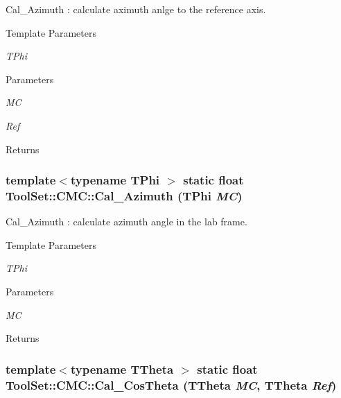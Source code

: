 Cal\_\-Azimuth : calculate aximuth anlge to the reference axis. 
\begin{DoxyTemplParams}{Template Parameters}
\item[{\em TPhi}]\end{DoxyTemplParams}

\begin{DoxyParams}{Parameters}
\item[{\em MC}]\item[{\em Ref}]\end{DoxyParams}
\begin{DoxyReturn}{Returns}

\end{DoxyReturn}
\hypertarget{classToolSet_1_1CMC_a3c8cfd47eac44d6e39a38598bb9158f1}{
\subsubsection[{Cal\_\-Azimuth}]{\setlength{\rightskip}{0pt plus 5cm}template$<$typename TPhi $>$ static float ToolSet::CMC::Cal\_\-Azimuth (TPhi {\em MC})}}
\label{classToolSet_1_1CMC_a3c8cfd47eac44d6e39a38598bb9158f1}


Cal\_\-Azimuth : calculate azimuth angle in the lab frame. 
\begin{DoxyTemplParams}{Template Parameters}
\item[{\em TPhi}]\end{DoxyTemplParams}

\begin{DoxyParams}{Parameters}
\item[{\em MC}]\end{DoxyParams}
\begin{DoxyReturn}{Returns}

\end{DoxyReturn}
\hypertarget{classToolSet_1_1CMC_a91c74f61d1c9656e68f4b1037976a51b}{
\subsubsection[{Cal\_\-CosTheta}]{\setlength{\rightskip}{0pt plus 5cm}template$<$typename TTheta $>$ static float ToolSet::CMC::Cal\_\-CosTheta (TTheta {\em MC}, \/  TTheta {\em Ref})}}
\label{classToolSet_1_1CMC_a91c74f61d1c9656e68f4b1037976a51b}



